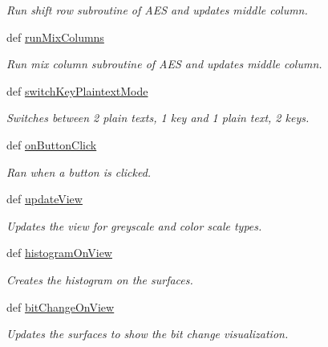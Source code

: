 \begin{DoxyCompactItemize}
\begin{DoxyCompactList}\small\item\em Run shift row subroutine of A\-E\-S and updates middle column. \end{DoxyCompactList}\item 
\hypertarget{classsimplegui_1_1_main_scene_a805cca2ef3e4086eb23505b8af930f18}{def \hyperlink{classsimplegui_1_1_main_scene_a805cca2ef3e4086eb23505b8af930f18}{run\-Mix\-Columns}}\label{classsimplegui_1_1_main_scene_a805cca2ef3e4086eb23505b8af930f18}

\begin{DoxyCompactList}\small\item\em Run mix column subroutine of A\-E\-S and updates middle column. \end{DoxyCompactList}\item 
def \hyperlink{classsimplegui_1_1_main_scene_a8570c31330b924dce8f26088e4e3fa3e}{switch\-Key\-Plaintext\-Mode}
\begin{DoxyCompactList}\small\item\em Switches between 2 plain texts, 1 key and 1 plain text, 2 keys. \end{DoxyCompactList}\item 
def \hyperlink{classsimplegui_1_1_main_scene_aaeb0e4df3ab8dd5a9cab35f28ad2f7a2}{on\-Button\-Click}
\begin{DoxyCompactList}\small\item\em Ran when a button is clicked. \end{DoxyCompactList}\item 
def \hyperlink{classsimplegui_1_1_main_scene_a1e32c0468a9abbd3e0e6b418c788c4e0}{update\-View}
\begin{DoxyCompactList}\small\item\em Updates the view for greyscale and color scale types. \end{DoxyCompactList}\item 
def \hyperlink{classsimplegui_1_1_main_scene_a1104ae8cca81e51cc77524c7e048464d}{histogram\-On\-View}
\begin{DoxyCompactList}\small\item\em Creates the histogram on the surfaces. \end{DoxyCompactList}\item 
def \hyperlink{classsimplegui_1_1_main_scene_a7155c316b15f3ff406c0fa44500ba768}{bit\-Change\-On\-View}
\begin{DoxyCompactList}\small\item\em Updates the surfaces to show the bit change visualization. \end{DoxyCompactList}\item 

\end{DoxyCompactItemize}
